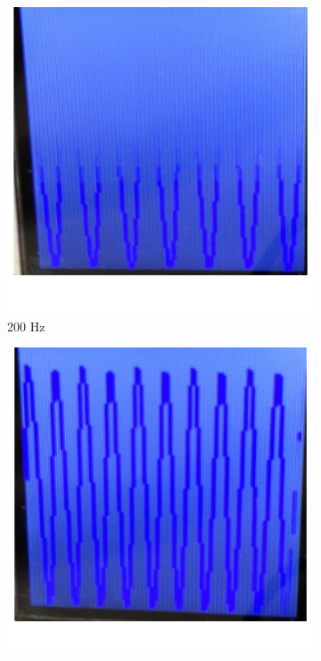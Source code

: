 \documentclass[12pt]{article}
\begin{document}
\begin{figure}[H]
\begin{subfigure}[b]{0.3\textwidth}
    \includegraphics[width=\textwidth]{./img/raw_200Hz}
    \caption{200 Hz}
    \label{fig:raw_200}
  \end{subfigure}
  \begin{subfigure}[b]{0.3\textwidth}
    \includegraphics[width=\textwidth]{./img/raw_300Hz}

\end{subfigure}
\end{figure}
\end{document}
